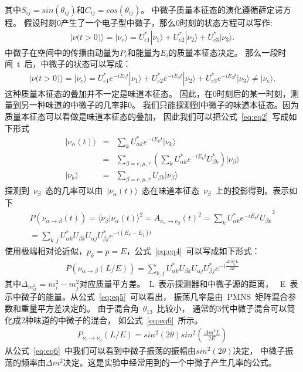 其中$S_{ij} = sin (\theta_{ij}) $和$C_{ij} = cos (\theta_{ij}) $。
中微子质量本征态的演化遵循薛定谔方程。
假设时刻0产生了一个电子型中微子，那么0时刻的状态方程可以写作:
\begin{eqnarray}\label{eq:eq1}
|\nu\big( t>0 \big ) \rangle = | \nu_e\rangle =U^*_{e1}|\nu_1\rangle+U^*_{e2}|\nu_2\rangle+U^*_{e3}|\nu_3\rangle .
\end{eqnarray}
中微子在空间中的传播由动量为$P_i$和能量为$E_i$的质量本征态决定。
那么一段时间~t~后，中微子的状态可以写成：
\begin{eqnarray}\label{eq:eq2}
|\nu\big (t>0\big )\rangle = | \nu_e\rangle =U^*_{e1}e^{-iE_1t}|\nu_1\rangle+U^*_{e2}e^{-iE_2t}|\nu_2\rangle+U^*_{e3}e^{-iE_3t}|\nu_3\rangle\neq |\nu_e\rangle .
\end{eqnarray}
这种质量本征态的叠加并不一定是味道本征态。
因此，在0时刻后的某一时刻，测量到另一种味道的中微子的几率非0。
我们只能探测到中微子的味道本征态。因为质量本征态可以看做是味道本征态的叠加，
因此我们可以把公式~\ref{eq:eq2}~写成如下形式
\begin{eqnarray}\label{eq:eq3}
 | \nu_{\alpha}(t)\rangle &=&\sum_k U^*_{\alpha k}e^{-iE_k t}|\nu_k\rangle \\
 &=& \sum_{\beta=e,\mu,\tau} \left ( \sum_k U^*_{\alpha k}e^{-iE_k t}U^*_{\beta k} \right )| \nu_{\beta}\rangle\\
| \nu_{k}\rangle &=& \sum_{\beta =e ,\mu,\tau}U_{\beta k}|\nu_{\beta} \rangle
\end{eqnarray}
探测到~$\nu_{\beta}$~态的几率可以由~$|\nu_{\alpha} (t) \rangle $~态在味道本征态~$\nu_{\beta}$~上的投影得到。表示如下
\begin{eqnarray}\label{eq:eq4}
P(\nu_{\alpha\rightarrow \beta }(t))={\langle \nu_{\beta}| \nu_{\alpha}(t)\rangle}^2={A_{\nu_{\alpha} \rightarrow \nu_{\beta}}(t)}^2={\sum_k U^*_{\alpha k}e^{-iE_k t}U_{\beta k}}^2 \\
=\sum_{k,j}U^*_{\alpha k}U_{\beta k}U_{\alpha j}U^*_{\beta j}e^{-i(E_k-E_j)t}
\end{eqnarray}
使用极端相对论近似，$p_k = p = E$，公式~\ref{eq:eq4}~可以写成如下形式：
\begin{eqnarray}\label{eq:eq5}
P(\nu_{\alpha\rightarrow \beta }(L/E))=
\sum_{k,j}U^*_{\alpha k}U_{\beta k}U_{\alpha j}U^*_{\beta j}e^{-i\frac{\Delta{m_{ij}^2}L}{2E}}
\end{eqnarray}
其中$\Delta_{m_{ik}^2}=m_i^2-m_j^2$对应质量平方差。~L~表示探测器和中微子源的距离，
~E~表示中微子的能量。从公式~\ref{eq:eq5}~可以看出，
振荡几率是由~PMNS~矩阵混合参数和重量平方差决定的。
由于混合角~$\theta_{13}$~比较小，
通常的3代中微子混合可以简化成2种味道的中微子的混合，
如公式~\ref{eq:eq6}~所示。
\begin{eqnarray}\label{eq:eq6}
P_{\nu_e  \rightarrow \nu_{\mu} } (L/E)=sin^2(2\theta)sin^2\left(\frac{\Delta m^2L}{2E}\right)
\end{eqnarray}
从公式~\ref{eq:eq6}~中我们可以看到中微子振荡的振幅由$sin^2(2\theta)$决定，
中微子振荡的频率由$\Delta m^2 $决定。这是实验中经常用到的一个中微子产生几率的公式。
